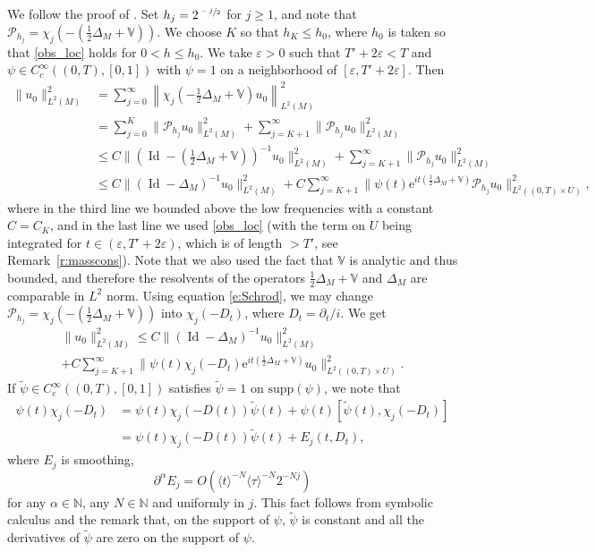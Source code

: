 \documentclass[JEP,XML,SOM,Unicode,published]{cedram}
\let\mathcal\mathscr
\newcommand{\rme}{\mathrm{e}}
\DeclareMathOperator{\Id}{Id}
\theoremstyle{plain}
\theoremstyle{definition}
\def\N{{\mathbb N}}
\def\bbV{{\mathbb V}}
\begin{document}
We follow the proof of \cite[Prop.\,4.1]{BZ}. Set $h_j=2^{\sfrac{-j}{2}}$ for $j\geq 1$, and note that $\mathcal{P}_{h_j}=\chi_j(-(\frac12\Delta_M+\bbV))$. We choose $K$ so that $h_K\leq h_0$, where $h_0$ is taken so that \eqref{obs_loc} holds for $0<h\leq h_0$. We take $\varepsilon>0$ such that $T'+2\varepsilon<T$ and $\psi\in C_c^\infty((0,T),[0,1])$ with $\psi=1$ on a neighborhood of $[\varepsilon,T'+2\varepsilon]$. Then
\begin{align*}
\|u_0\|_{L^2(M)}^2&=\sum_{j=0}^\infty \left\|\chi_j\left(-\tfrac12\Delta_M+\bbV\right)u_0\right\|^2_{L^2(M)}\\
&= \sum_{j=0}^K \|\mathcal{P}_{h_j}u_0\|^2_{L^2(M)}+\sum_{j=K+1}^\infty \|\mathcal{P}_{h_j}u_0\|^2_{L^2(M)} \\
&\leq C \bigl\|\left(\Id-(\tfrac12\Delta_M+\bbV)\right)^{-1}u_0\bigr\|^2_{L^2(M)}+\sum_{j=K+1}^\infty \|\mathcal{P}_{h_j}u_0\|^2_{L^2(M)} \\
&\leq C\|(\Id-\Delta_M)^{-1}u_0\|^2_{L^2(M)}+C\sum_{j=K+1}^\infty \bigl\| \psi(t) \rme^{it(\frac12 \Delta_M+\bbV)}\mathcal{P}_{h_j} u_0\bigr\|^2_{L^2((0,T)\times U)},
\end{align*}
where in the third line we bounded above the low frequencies with a constant $C=C_K$, and in the last line we used \eqref{obs_loc} (with the term on $U$ being integrated for $t\in (\varepsilon,T'+2\varepsilon)$, which is of length $>T'$, see Remark~\ref{r:masscons}). Note that we also used the fact that $\bbV$ is analytic and thus bounded, and therefore the resolvents of the operators $\frac12\Delta_M+\bbV$ and $\Delta_M$ are comparable in $L^2$ norm.
Using equation \eqref{e:Schrod}, we may change $\mathcal{P}_{h_j}=\chi_j(-(\frac12\Delta_M+\bbV))$ into $\chi_j(-D_t)$, where $D_t=\partial_t/i$. We get
\begin{multline*}
\|u_0\|_{L^2(M)}^2\leq C\|(\Id-\Delta_M)^{-1}u_0\|^2_{L^2(M)}\\+C\sum_{j=K+1}^\infty \bigl\|\psi(t) \chi_j(-D_t) \rme^{it(\frac12 \Delta_M+\bbV)} u_0 \bigr\|^2_{L^2((0,T)\times U)}.
\end{multline*}
If $\widetilde{\psi}\in C_c^\infty((0,T),[0,1])$ satisfies $\widetilde{\psi}=1$ on $\text{supp}(\psi)$, we note that
\[
\begin{split}
\psi(t)\chi_j(-D_t)&=\psi(t)\chi_j(-D(t))\widetilde{\psi}(t)+\psi(t)[\widetilde{\psi}(t),\chi_j(-D_t)] \\
&=\psi(t)\chi_j(-D(t))\widetilde{\psi}(t)+E_j(t,D_t),
\end{split}
\]
where $E_j$ is smoothing, \ie
\begin{equation*}
\partial^\alpha E_j=O(\langle t\rangle^{-N}\langle\tau\rangle^{-N}2^{-Nj})
\end{equation*}
for any $\alpha\in\N$, any $N\in\N$ and uniformly in $j$. This fact follows from symbolic calculus and the remark that, on the support of $\psi$, $\widetilde{\psi}$ is constant and
all the derivatives of $\widetilde \psi$ are zero on the support of $\psi$.
\end{document}
